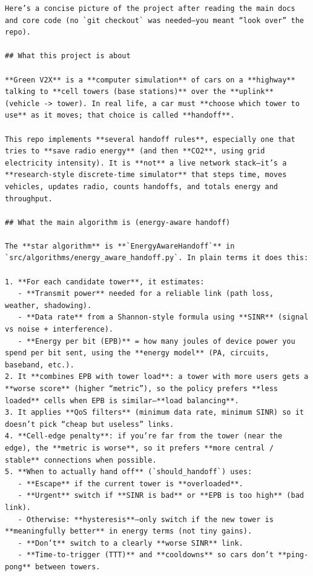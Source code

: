 \documentclass[11pt,a4paper]{article}
\newenvironment{assistantbox}
  {\begin{tcolorbox}[
    breakable,
    colback=AsstBG,
    colframe=AsstBorder,
    title=Project Overview Extract,
    fonttitle=\bfseries\small\color{white},
    coltitle=white,
    colbacktitle=AsstBorder,
    boxrule=0.5pt,
    arc=1.2mm,
    left=1.4mm,right=1.4mm,top=0.8mm,bottom=0.8mm,
    boxsep=0.6mm,
    before skip=0pt,
    after skip=0pt
  ]}
  {\end{tcolorbox}}
\begin{document}
\begin{assistantbox}
\begin{Verbatim}[breaklines=true,breakanywhere=true]
Here’s a concise picture of the project after reading the main docs and core code (no `git checkout` was needed—you meant “look over” the repo).

## What this project is about

**Green V2X** is a **computer simulation** of cars on a **highway** talking to **cell towers (base stations)** over the **uplink** (vehicle -> tower). In real life, a car must **choose which tower to use** as it moves; that choice is called **handoff**.

This repo implements **several handoff rules**, especially one that tries to **save radio energy** (and then **CO2**, using grid electricity intensity). It is **not** a live network stack—it’s a **research-style discrete-time simulator** that steps time, moves vehicles, updates radio, counts handoffs, and totals energy and throughput.

## What the main algorithm is (energy-aware handoff)

The **star algorithm** is **`EnergyAwareHandoff`** in `src/algorithms/energy_aware_handoff.py`. In plain terms it does this:

1. **For each candidate tower**, it estimates:
   - **Transmit power** needed for a reliable link (path loss, weather, shadowing).
   - **Data rate** from a Shannon-style formula using **SINR** (signal vs noise + interference).
   - **Energy per bit (EPB)** = how many joules of device power you spend per bit sent, using the **energy model** (PA, circuits, baseband, etc.).
2. It **combines EPB with tower load**: a tower with more users gets a **worse score** (higher “metric”), so the policy prefers **less loaded** cells when EPB is similar—**load balancing**.
3. It applies **QoS filters** (minimum data rate, minimum SINR) so it doesn’t pick “cheap but useless” links.
4. **Cell-edge penalty**: if you’re far from the tower (near the edge), the **metric is worse**, so it prefers **more central / stable** connections when possible.
5. **When to actually hand off** (`should_handoff`) uses:
   - **Escape** if the current tower is **overloaded**.
   - **Urgent** switch if **SINR is bad** or **EPB is too high** (bad link).
   - Otherwise: **hysteresis**—only switch if the new tower is **meaningfully better** in energy terms (not tiny gains).
   - **Don’t** switch to a clearly **worse SINR** link.
   - **Time-to-trigger (TTT)** and **cooldowns** so cars don’t **ping-pong** between towers.


\end{Verbatim}
\end{assistantbox}
\end{document}
